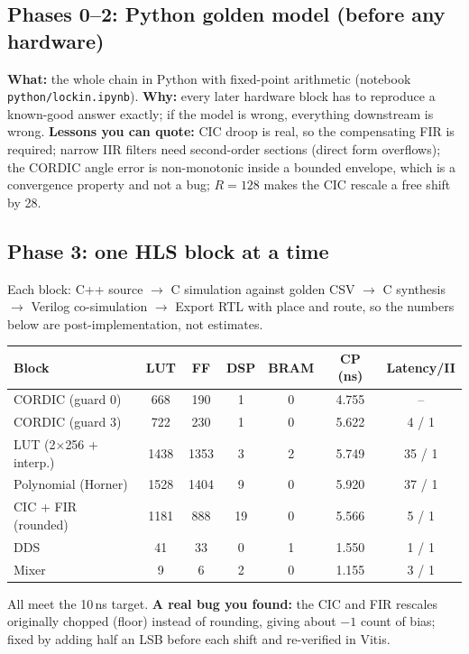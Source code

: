 \documentclass[10pt,a4paper]{article}
\renewcommand{\c}[1]{\texttt{#1}}
\begin{document}
\subsection*{Phases 0--2: Python golden model (before any hardware)}
\textbf{What:} the whole chain in Python with fixed-point arithmetic (notebook \c{python/lockin.ipynb}). \textbf{Why:} every later hardware block has to reproduce a known-good answer exactly; if the model is wrong, everything downstream is wrong. \textbf{Lessons you can quote:} CIC droop is real, so the compensating FIR is required; narrow IIR filters need second-order sections (direct form overflows); the CORDIC angle error is non-monotonic inside a bounded envelope, which is a convergence property and not a bug; $R=128$ makes the CIC rescale a free shift by 28.

\subsection*{Phase 3: one HLS block at a time}
Each block: C++ source $\to$ C simulation against golden CSV $\to$ C synthesis $\to$ Verilog co-simulation $\to$ Export RTL with place and route, so the numbers below are post-implementation, not estimates.
\begin{center}\footnotesize
\begin{tabular}{@{}lcccccc@{}}\toprule
Block & LUT & FF & DSP & BRAM & CP (ns) & Latency/II\\ \midrule
CORDIC (guard 0) & 668 & 190 & 1 & 0 & 4.755 & --\\
CORDIC (guard 3) & 722 & 230 & 1 & 0 & 5.622 & 4 / 1\\
LUT (2$\times$256 + interp.) & 1438 & 1353 & 3 & 2 & 5.749 & 35 / 1\\
Polynomial (Horner) & 1528 & 1404 & 9 & 0 & 5.920 & 37 / 1\\
CIC + FIR (rounded) & 1181 & 888 & 19 & 0 & 5.566 & 5 / 1\\
DDS & 41 & 33 & 0 & 1 & 1.550 & 1 / 1\\
Mixer & 9 & 6 & 2 & 0 & 1.155 & 3 / 1\\ \bottomrule
\end{tabular}
\end{center}
All meet the 10\,ns target. \textbf{A real bug you found:} the CIC and FIR rescales originally chopped (floor) instead of rounding, giving about $-1$ count of bias; fixed by adding half an LSB before each shift and re-verified in Vitis.
\end{document}

